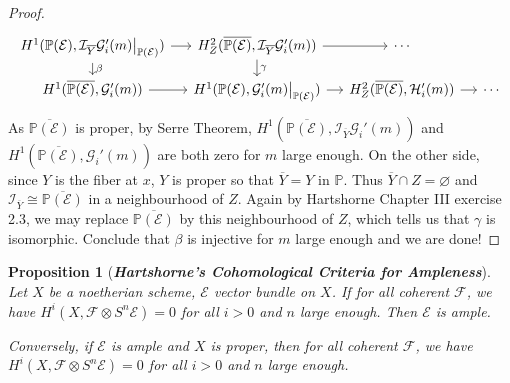 \documentclass{ctexart}
\newtheorem{proposition}{Proposition}[section]
\begin{document}
\begin{proof}
\begin{equation}
\begin{tikzcd}[sep = small]
            H^{1}(\mathbb{P}(\mathcal{E}), \mathcal{I}_{\overline{Y}}\mathcal{G}_{i}'(m)\big{|}_{\mathbb{P}(\mathcal{E})}) \arrow[r] \arrow[d, "\beta"] &
            H_{Z}^{2}(\overline{\mathbb{P}(\mathcal{E})}, \mathcal{I}_{\overline{Y}}\mathcal{G}_{i}'(m)) \arrow[r] \arrow[d, "\gamma"] &
            \cdots \\
            H^{1}(\overline{\mathbb{P}(\mathcal{E})}, \mathcal{G}_{i}'(m)) \arrow[r] &
            H^{1}(\mathbb{P}(\mathcal{E}), \mathcal{G}_{i}'(m)\big{|}_{\mathbb{P}(\mathcal{E})}) \arrow[r] &
            H_{Z}^{2}(\overline{\mathbb{P}(\mathcal{E})}, \mathcal{H}_{i}'(m)) \arrow[r] &
            \cdots
        \end{tikzcd}
    \end{equation}
    As $\overline{\mathbb{P}(\mathcal{E})}$ is proper, by Serre Theorem,
    $H^{1}(\overline{\mathbb{P}(\mathcal{E})}, \mathcal{I}_{\overline{Y}}\mathcal{G}_{i}'(m))$ and $H^{1}(\overline{\mathbb{P}(\mathcal{E})}, \mathcal{G}_{i}'(m))$ are both zero for $m$ large enough.
    On the other side, since $Y$ is the fiber at $x$, $Y$ is proper so that $\overline{Y} = Y$ in $\mathbb{P}$.
    Thus $\overline{Y} \cap Z = \varnothing$ and $\mathcal{I}_{\overline{Y}} \cong \mathcal{\overline{\mathbb{P}(\mathcal{E})}}$ in a neighbourhood of $Z$.
    Again by Hartshorne Chapter III exercise 2.3, we may replace $\overline{\mathbb{P}(\mathcal{E})}$ by this neighbourhood of $Z$, which tells us that $\gamma$ is isomorphic.
    Conclude that $\beta$ is injective for $m$ large enough and we are done!
\end{proof}
\begin{proposition}[\textbf{\emph{Hartshorne's Cohomological Criteria for Ampleness}}]
    Let $X$ be a noetherian scheme, $\mathcal{E}$ vector bundle on $X$.
    If for all coherent $\mathcal{F}$, we have $H^{i}(X, \mathcal{F} \otimes S^{n}\mathcal{E}) = 0$ for all $i > 0$ and $n$ large enough.
    Then $\mathcal{E}$ is ample.
    \par
    Conversely, if $\mathcal{E}$ is ample and $X$ is proper, then for all coherent $\mathcal{F}$,
    we have $H^{i}(X, \mathcal{F} \otimes S^{n}\mathcal{E}) = 0$ for all $i > 0$ and $n$ large enough.
    \label{Proposition 4.12}
\end{proposition}
\end{document}
